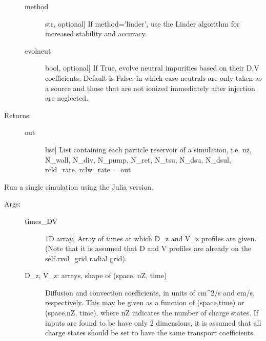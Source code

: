 \documentclass[letterpaper,10pt,english]{sphinxmanual}
\begin{document}
\begin{fulllineitems}
\begin{fulllineitems}
\begin{description}
\begin{description}
\item[{method}] \leavevmode{[}str, optional{]}
If method=’linder’, use the Linder algorithm for increased stability and accuracy.

\item[{evolneut}] \leavevmode{[}bool, optional{]}
If True, evolve neutral impurities based on their D,V coefficients. Default is False, in
which case neutrals are only taken as a source and those that are not ionized immediately after
injection are neglected.

\end{description}

\item[{Returns:}] \leavevmode\begin{description}
\item[{out}] \leavevmode{[}list{]}
List containing each particle reservoir of a simulation, i.e.
nz, N\_wall, N\_div, N\_pump, N\_ret, N\_tsu, N\_dsu, N\_dsul, rcld\_rate, rclw\_rate = out

\end{description}

\end{description}

\end{fulllineitems}


\begin{fulllineitems}
\label{\detokenize{aurora:aurora.core.aurora_sim.run_julia}}
Run a single simulation using the Julia version.
\begin{description}
\item[{Args:}] \leavevmode\begin{description}
\item[{times\_DV}] \leavevmode{[}1D array{]}
Array of times at which D\_z and V\_z profiles are given. (Note that it is assumed that
D and V profiles are already on the self.rvol\_grid radial grid).

\item[{D\_z, V\_z: arrays, shape of (space, nZ, time)}] \leavevmode
Diffusion and convection coefficients, in units of cm\textasciicircum{}2/s and cm/s, respectively.
This may be given as a function of (space,time) or (space,nZ, time), where nZ indicates
the number of charge states. If inputs are found to be have only 2 dimensions, it is
assumed that all charge states should be set to have the same transport coefficients.


\end{description}
\end{description}
\end{fulllineitems}
\end{fulllineitems}
\end{document}
